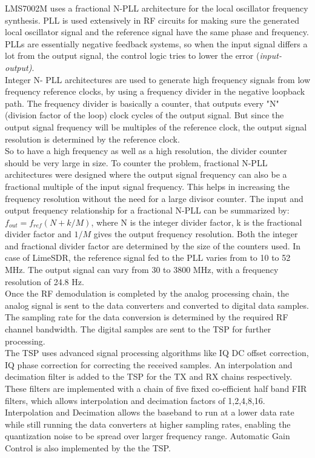 LMS7002M uses a fractional N-\ac{PLL} architecture for the local oscillator frequency synthesis.
\ac{PLL} is used extensively in \ac{RF} circuits for making sure the generated local oscillator signal and the reference signal have the same phase and frequency.
PLLs are essentially negative feedback systems, so when the input signal differs a lot from the output signal, the control logic tries to lower the error (\textit{input-output)}.\\

Integer N- \ac{PLL} architectures are used to generate high frequency signals from low frequency reference clocks, by using a frequency divider in the negative loopback path.
The frequency divider is basically a counter, that outputs every "N" (division factor of the loop) clock cycles of the output signal.
But since the output signal frequency will be multiples of the reference clock, the output signal resolution is determined by the  reference clock.\\

So to have a high frequency as well as a high resolution, the divider counter should be very large in size.
To counter the problem, fractional N-{PLL} architectures were designed where the output signal frequency can also be a fractional multiple of the input signal frequency.
This helps in increasing the frequency resolution without the need for a large divisor counter.
The input and output frequency relationship for a fractional  N-\ac{PLL} can be summarized by: $f_{out}=f_{ref}(N+k/M)$, where N is the integer divider factor, k is the fractional divider factor and $1/M$ gives the output frequency resolution.
Both the integer and fractional divider factor are determined by the size of the counters used.
In case of LimeSDR, the reference signal fed to the PLL varies from to 10 to 52 MHz.
The output signal can vary from 30 to 3800 MHz, with a frequency resolution of 24.8 Hz.\\

Once the \ac{RF} demodulation is completed by the analog processing chain, the analog signal is sent to the data converters and converted to digital data samples.
The sampling rate for the data conversion is determined by the required \ac{RF} channel bandwidth.
The digital samples are sent to the \ac{TSP} for further processing.\\

The \ac{TSP} uses advanced signal processing algorithms like IQ DC offset correction, IQ phase correction for correcting the received samples.
An interpolation and decimation filter is added to the \ac{TSP} for the TX and RX chains respectively.
These filters are implemented with a chain of five fixed co-efficient half band \ac{FIR} filters, which allows interpolation and decimation factors of 1,2,4,8,16.
Interpolation and Decimation allows the baseband to run at a lower data rate while still running the data converters at higher sampling rates, enabling the quantization noise to be spread over larger frequency range.
Automatic Gain Control is also implemented by the the \ac{TSP}.\\

